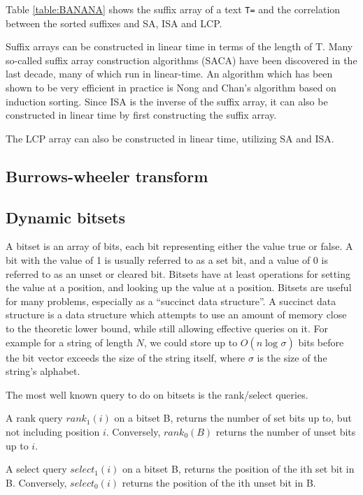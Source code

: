 Table \ref{table:BANANA} shows the suffix array of a text \texttt{T=} and the correlation
between the sorted suffixes and SA, ISA and LCP.


Suffix arrays can be constructed in linear time in terms of the length of T. Many
so-called suffix array construction algorithms (SACA) have been discovered in the last
decade\cite{SuffixArrayConstruction}, many of which run in linear-time. An algorithm
which has been shown to be very efficient in practice is Nong and
Chan's\cite{LinearTimeSuffixArraySAIS} algorithm based on induction sorting. Since ISA is
the inverse of the suffix array, it can also be constructed in linear time by first
constructing the suffix array.

The LCP array can also be constructed in linear time, utilizing SA and ISA.



\subsection{Burrows-wheeler transform}


\subsection{Dynamic bitsets}

A bitset is an array of bits, each bit representing either the value true or false. A bit
with the value of 1 is usually referred to as a set bit, and a value of 0 is referred to
as an unset or cleared bit. Bitsets have at least operations for setting the value at a
position, and looking up the value at a position. Bitsets are useful for many problems,
especially as a ``succinct data structure''. A succinct data structure is a data structure
which attempts to use an amount of memory close to the theoretic lower bound, while still
allowing effective queries on it. For example for a string of length $N$, we could store
up to $O(n \log_{}\sigma)$ bits before the bit vector exceeds the size of the string
itself, where $\sigma$ is the size of the string's alphabet.

The most well known query to do on bitsets is the rank/select queries.

\begin{definition}
    A rank query $rank_1(i)$ on a bitset B, returns the number of set bits
    up to, but not including position $i$. Conversely, $rank_0(B)$ returns the number of
    unset bits up to $i$.
\end{definition}
\begin{definition}
    A select query $select_1(i)$ on a bitset B, returns the position of the ith
    set bit in B. Conversely, $select_0(i)$ returns the position of the ith unset bit in
    B.
\end{definition}

